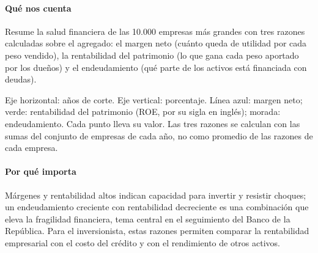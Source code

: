 \paragraph{Qué nos cuenta}
Resume la salud financiera de las 10.000 empresas más grandes con tres razones calculadas sobre el agregado: el margen neto (cuánto queda de utilidad por cada peso vendido), la rentabilidad del patrimonio (lo que gana cada peso aportado por los dueños) y el endeudamiento (qué parte de los activos está financiada con deudas).

\begin{leer}
Eje horizontal: años de corte. Eje vertical: porcentaje. Línea azul: margen neto; verde: rentabilidad del patrimonio (ROE, por su sigla en inglés); morada: endeudamiento. Cada punto lleva su valor. Las tres razones se calculan con las sumas del conjunto de empresas de cada año, no como promedio de las razones de cada empresa.
\end{leer}

\paragraph{Por qué importa}
Márgenes y rentabilidad altos indican capacidad para invertir y resistir choques; un endeudamiento creciente con rentabilidad decreciente es una combinación que eleva la fragilidad financiera, tema central en el seguimiento del Banco de la República. Para el inversionista, estas razones permiten comparar la rentabilidad empresarial con el costo del crédito y con el rendimiento de otros activos.

